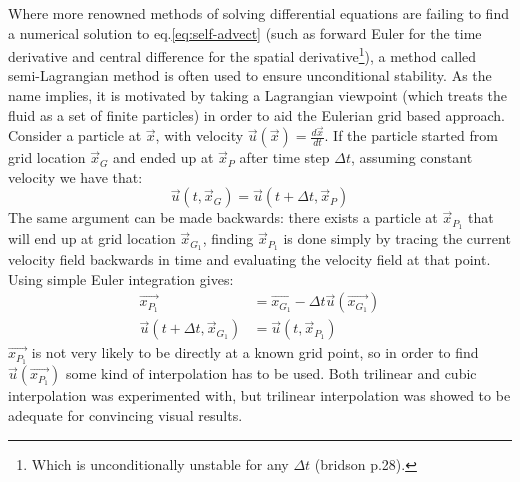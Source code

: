 Where more renowned methods of solving differential equations are failing to find a numerical solution to eq.\ref{eq:self-advect} (such as forward Euler for the time derivative and central difference for the spatial derivative\footnote{Which is unconditionally unstable for any \begin{math}\Delta t\end{math} (bridson p.28).}), a method called semi-Lagrangian method is often used to ensure unconditional stability. As the name implies, it is motivated by taking a Lagrangian viewpoint (which treats the fluid as a set of finite particles) in order to aid the Eulerian grid based approach. Consider a particle at  \begin{math}\vec{x}\end{math}, with velocity \begin{math}\vec{u}(\vec{x}) = \frac{d\vec{x}}{dt}\end{math}. If the particle started from grid location \begin{math}\vec{x}_G\end{math} and ended up at \begin{math}\vec{x}_P\end{math} after time step \begin{math}\Delta t \end{math}, assuming constant velocity we have that: 
\begin{equation}
\vec{u}(t,\vec{x}_G) = \vec{u}(t+\Delta t,\vec{x}_P)  
\end{equation}
The same argument can be made backwards: there exists a particle at \begin{math}\vec{x}_{P_1} \end{math} that will end up at grid location \begin{math}\vec{x}_{G_1}\end{math}, finding \begin{math}\vec{x}_{P_1}\end{math} is done simply by tracing the current velocity field backwards in time and evaluating the velocity field at that point. Using simple Euler integration gives: 
	\begin{align}
					      \label{eq:lagrangian}\vec{x_{P_1}}  & =    \vec{x_{G_1}} -  \Delta t \vec{u}(\vec{x_{G_1}})  \\ 
		\vec{u}(t + \Delta t,\vec{x}_{G_1}) &  =    \vec{u}(t,\vec{x}_{P_1}) 
	\end{align}
\begin{math} \vec{x_{P_1}} \end{math} is not very likely to be directly at a known grid point, so in order to find \begin{math} \vec{u}(\vec{x_{P_1}}) \end{math} some kind of interpolation has to be used. Both trilinear and cubic interpolation was experimented with, but trilinear interpolation was showed to be adequate for convincing visual results. 